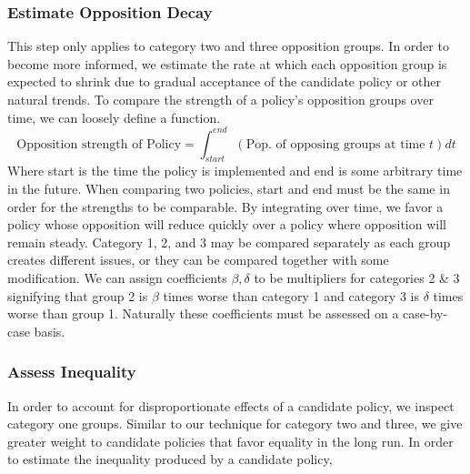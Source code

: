 \documentclass[a4paper,12pt]{article}
\begin{document}
\subsubsection{Estimate Opposition Decay}
This step only applies to category two and three opposition groups.
In order to become more informed, we estimate the rate at which each opposition group is expected to shrink due to gradual acceptance of the candidate policy or other natural trends.
To compare the strength of a policy's opposition groups over time, we can loosely define a function.
$$\textrm{Opposition strength of Policy} = \int_{start}^{end} (\textrm{Pop.\ of opposing groups at time }t) dt$$
Where start is the time the policy is implemented and end is some arbitrary time in the future.
When comparing two policies, start and end must be the same in order for the strengths to be comparable.
By integrating over time, we favor a policy whose opposition will reduce quickly over a policy where opposition will remain steady.
Category 1, 2, and 3 may be compared separately as each group creates different issues, or they can be compared together with some modification.
We can assign coefficients $\beta, \delta$ to be multipliers for categories 2 \& 3 signifying that group 2 is $\beta$ times worse than category 1 and category 3 is $\delta$ times worse than group 1.
Naturally these coefficients must be assessed on a case-by-case basis.

\subsubsection{Assess Inequality}
In order to account for disproportionate effects of a candidate policy, we inspect category one groups.
Similar to our technique for category two and three, we give greater weight to candidate policies that favor equality in the long run.
In order to estimate the inequality produced by a candidate policy,


\nocite{*}



\end{document}
